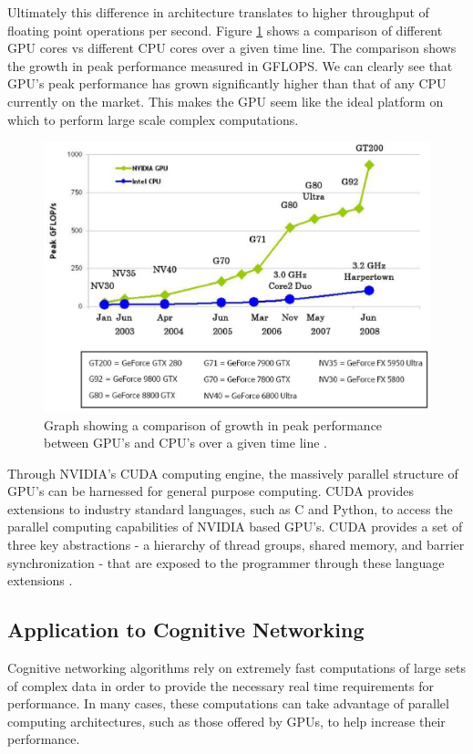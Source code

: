Ultimately this difference in architecture translates to higher throughput of floating point operations per second.  Figure \ref{fig:cpu_vs_gpu_gflops} shows a comparison of different GPU cores vs different CPU cores over a given time line.  The comparison shows the growth in peak performance measured in GFLOPS.  We can clearly see that GPU's peak performance has grown significantly higher than that of any CPU currently on the market.  This makes the GPU seem like the ideal platform on which to perform large scale complex computations.

\begin{figure}[ht]
\begin{center}
 \includegraphics[scale=0.65]{images/gpu_images/cpu_vs_gpu_gflops.eps}
\end{center}
\caption{Graph showing a comparison of growth in peak performance between GPU's and CPU's over a given time line \cite{Nvidia08}.}
\label{fig:cpu_vs_gpu_gflops}
\end{figure}

Through NVIDIA's CUDA computing engine, the massively parallel structure of GPU's can be harnessed for general purpose computing.  CUDA provides extensions to industry standard languages, such as C and Python, to access the parallel computing capabilities of NVIDIA based GPU's.  CUDA provides a set of three key abstractions - a hierarchy of thread groups, shared memory, and barrier synchronization - that are exposed to the programmer through these language extensions \cite{Nvidia08}.

\subsection{Application to Cognitive Networking}
Cognitive networking algorithms rely on extremely fast computations of large sets of complex data in order to provide the necessary real time requirements for performance.  In many cases, these computations can take advantage of parallel computing architectures, such as those offered by GPUs, to help increase their performance.

